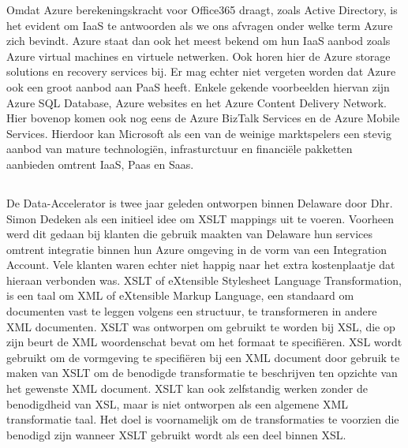 Omdat Azure berekeningskracht voor Office365 draagt, zoals Active Directory, is het evident om IaaS te antwoorden als we ons afvragen onder welke term Azure zich bevindt. Azure staat dan ook het meest bekend om hun IaaS aanbod zoals Azure virtual machines en virtuele netwerken. Ook horen hier de Azure storage solutions en recovery services bij. Er mag echter niet vergeten worden dat Azure ook een groot aanbod aan PaaS heeft. Enkele gekende voorbeelden hiervan zijn Azure SQL Database, Azure websites en het Azure Content Delivery Network. Hier bovenop komen ook nog eens de Azure BizTalk Services en de Azure Mobile Services. Hierdoor kan Microsoft als een van de weinige marktspelers een stevig aanbod van mature technologiën, infrasturctuur en financiële pakketten aanbieden omtrent IaaS, Paas en Saas.\autocite{Copeland2015}

\subsection{}%
\label{sec:Ontstaan Data-Accelerator}

De Data-Accelerator is twee jaar geleden ontworpen binnen Delaware door Dhr. Simon Dedeken als een initieel idee om XSLT mappings uit te voeren. Voorheen werd dit gedaan bij klanten die gebruik maakten van Delaware hun services omtrent integratie binnen hun Azure omgeving in de vorm van een Integration Account. Vele klanten waren echter niet happig naar het extra kostenplaatje dat hieraan verbonden was. XSLT of eXtensible Stylesheet Language Transformation, is een taal om XML of eXtensible Markup Language, een standaard om documenten vast te leggen volgens een structuur, te transformeren in andere XML documenten. XSLT was ontworpen om gebruikt te worden bij XSL, die op zijn beurt de XML woordenschat bevat om het formaat te specifiëren. XSL wordt gebruikt om de vormgeving te specifiëren bij een XML document door gebruik te maken van XSLT om de benodigde transformatie te beschrijven ten opzichte van het gewenste XML document. XSLT kan ook zelfstandig werken zonder de benodigdheid van XSL, maar is niet ontworpen als een algemene XML transformatie taal. Het doel is voornamelijk om de transformaties te voorzien die benodigd zijn wanneer XSLT gebruikt wordt als een deel binnen XSL.\autocite{W3C1999}

